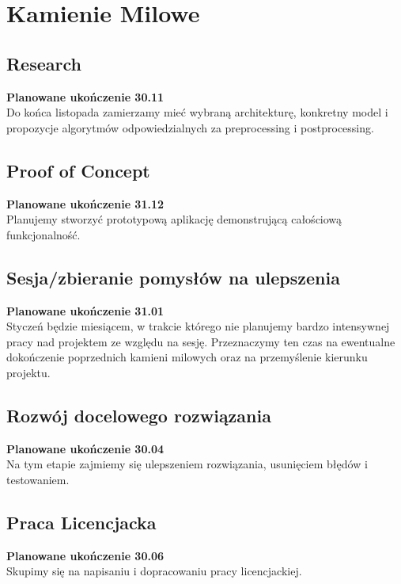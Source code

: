 \documentclass[12pt]{article}
\begin{document}
\section*{Kamienie Milowe}
\subsection*{Research}
\textbf{Planowane ukończenie 30.11}\\
Do końca listopada zamierzamy mieć wybraną architekturę, konkretny model i propozycje algorytmów odpowiedzialnych za preprocessing i postprocessing.
\subsection*{Proof of Concept}
\textbf{Planowane ukończenie 31.12}\\
Planujemy stworzyć prototypową aplikację demonstrującą całościową funkcjonalność. 
\subsection*{Sesja/zbieranie pomysłów na ulepszenia}
\textbf{Planowane ukończenie 31.01}\\
Styczeń będzie miesiącem, w trakcie którego nie planujemy bardzo intensywnej pracy nad projektem ze względu na sesję. Przeznaczymy ten czas na ewentualne dokończenie poprzednich kamieni milowych oraz na przemyślenie kierunku projektu.
\subsection*{Rozwój docelowego rozwiązania}
\textbf{Planowane ukończenie 30.04}\\
Na tym etapie zajmiemy się ulepszeniem rozwiązania, usunięciem błędów i testowaniem. 
\subsection*{Praca Licencjacka}
\textbf{Planowane ukończenie 30.06}\\
Skupimy się na napisaniu i dopracowaniu pracy licencjackiej.




\end{document}
